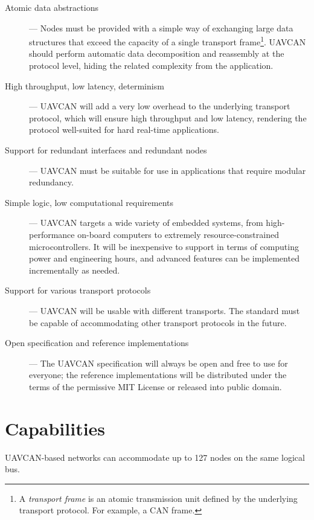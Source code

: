 \begin{description}
    \item[Atomic data abstractions] --- Nodes must be provided with a simple way of exchanging large
    data structures that exceed the capacity of a single transport frame\footnote{A \emph{transport frame} is
    an atomic transmission unit defined by the underlying transport protocol. For example, a CAN frame.}.
    UAVCAN should perform automatic data decomposition and reassembly at the protocol level,
    hiding the related complexity from the application.

    \item[High throughput, low latency, determinism] --- UAVCAN will add a very low overhead to the underlying
    transport protocol, which will ensure high throughput and low latency, rendering the protocol well-suited
    for hard real-time applications.

    \item[Support for redundant interfaces and redundant nodes] --- UAVCAN must be suitable for use in
    applications that require modular redundancy.

    \item[Simple logic, low computational requirements] --- UAVCAN targets a wide variety of embedded systems,
    from high-performance on-board computers to extremely resource-constrained microcontrollers.
    It will be inexpensive to support in terms of computing power and engineering hours,
    and advanced features can be implemented incrementally as needed.

    \item[Support for various transport protocols] --- UAVCAN will be usable with different transports.
    The standard must be capable of accommodating other transport protocols in the future.

    \item[Open specification and reference implementations] --- The UAVCAN specification will always be open and
    free to use for everyone; the reference implementations will be distributed under the terms of
    the permissive MIT License or released into public domain.
\end{description}

\section{Capabilities}

UAVCAN-based networks can accommodate up to 127 nodes on the same logical bus.

